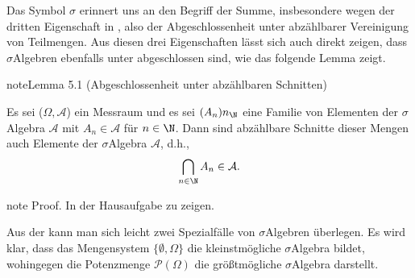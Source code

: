 \documentclass[letterpaper,10pt,english]{jupyterBook}
\begin{document}
\sphinxAtStartPar
Das Symbol \(\sigma\) erinnert uns an den Begriff der Summe, insbesondere wegen der dritten Eigenschaft in {\hyperref[\detokenize{masstheorie/masstheorie:def:sigmaalgebra}]{}}, also der Abgeschlossenheit unter abzählbarer Vereinigung von Teilmengen.
Aus diesen drei Eigenschaften lässt sich auch direkt zeigen, dass \(\sigma\)\sphinxhyphen{}Algebren ebenfalls unter  abgeschlossen sind, wie das folgende Lemma zeigt.
\label{masstheorie/masstheorie:lemma-1}
\begin{sphinxadmonition}{note}{Lemma 5.1 (Abgeschlossenheit unter abzählbaren Schnitten)}



\sphinxAtStartPar
Es sei (\(\Omega,\mathcal{A}\)) ein Messraum und es sei \((A_n)n_\N\) eine Familie von Elementen der \(\sigma\)\sphinxhyphen{}Algebra \(\mathcal{A}\) mit \(A_n \in \mathcal{A}\) für \(n \in \N\).
Dann sind abzählbare Schnitte dieser Mengen auch Elemente der \(\sigma\)\sphinxhyphen{}Algebra \(\mathcal{A}\), d.h.,
\begin{equation*}
\begin{split}\bigcap_{n \in \N} A_n \in \mathcal{A}.\end{split}
\end{equation*}\end{sphinxadmonition}

\begin{sphinxadmonition}{note}
\sphinxAtStartPar
Proof. In der Hausaufgabe zu zeigen.
\end{sphinxadmonition}

\sphinxAtStartPar
Aus der {\hyperref[\detokenize{masstheorie/masstheorie:def:sigmaalgebra}]{}} kann man sich leicht zwei Spezialfälle von \(\sigma\)\sphinxhyphen{}Algebren überlegen.
Es wird klar, dass das Mengensystem \(\{\emptyset, \Omega\}\) die kleinstmögliche \(\sigma\)\sphinxhyphen{}Algebra bildet, wohingegen die Potenzmenge \(\mathcal{P}(\Omega)\) die größtmögliche \(\sigma\)\sphinxhyphen{}Algebra darstellt.
\end{document}

